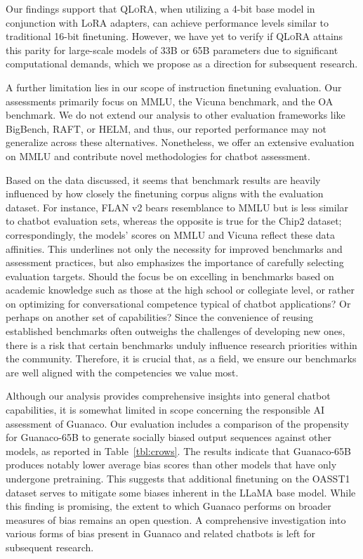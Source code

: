 Our findings support that \textsc{QLoRA}, when utilizing a 4-bit base model in conjunction with LoRA adapters, can achieve performance levels similar to traditional 16-bit finetuning. However, we have yet to verify if \textsc{QLoRA} attains this parity for large-scale models of 33B or 65B parameters due to significant computational demands, which we propose as a direction for subsequent research.

A further limitation lies in our scope of instruction finetuning evaluation. Our assessments primarily focus on MMLU, the Vicuna benchmark, and the OA benchmark. We do not extend our analysis to other evaluation frameworks like BigBench, RAFT, or HELM, and thus, our reported performance may not generalize across these alternatives. Nonetheless, we offer an extensive evaluation on MMLU and contribute novel methodologies for chatbot assessment.

Based on the data discussed, it seems that benchmark results are heavily influenced by how closely the finetuning corpus aligns with the evaluation dataset. For instance, FLAN v2 bears resemblance to MMLU but is less similar to chatbot evaluation sets, whereas the opposite is true for the Chip2 dataset; correspondingly, the models’ scores on MMLU and Vicuna reflect these data affinities. This underlines not only the necessity for improved benchmarks and assessment practices, but also emphasizes the importance of carefully selecting evaluation targets. Should the focus be on excelling in benchmarks based on academic knowledge such as those at the high school or collegiate level, or rather on optimizing for conversational competence typical of chatbot applications? Or perhaps on another set of capabilities? Since the convenience of reusing established benchmarks often outweighs the challenges of developing new ones, there is a risk that certain benchmarks unduly influence research priorities within the community. Therefore, it is crucial that, as a field, we ensure our benchmarks are well aligned with the competencies we value most.

Although our analysis provides comprehensive insights into general chatbot capabilities, it is somewhat limited in scope concerning the responsible AI assessment of {Guanaco}. Our evaluation includes a comparison of the propensity for {Guanaco}-65B to generate socially biased output sequences against other models, as reported in Table~\ref{tbl:crows}. The results indicate that {Guanaco}-65B produces notably lower average bias scores than other models that have only undergone pretraining. This suggests that additional finetuning on the OASST1 dataset serves to mitigate some biases inherent in the LLaMA base model. While this finding is promising, the extent to which {Guanaco} performs on broader measures of bias remains an open question. A comprehensive investigation into various forms of bias present in {Guanaco} and related chatbots is left for subsequent research.

